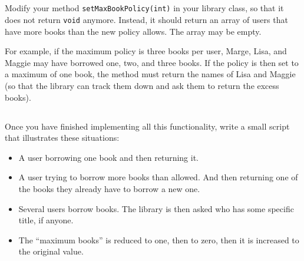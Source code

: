 \documentclass{article}
\begin{document}
\subsection{}

Modify your method \verb+setMaxBookPolicy(int)+ in your library class,
so that it does not return \verb+void+ anymore. Instead, it should
return an array of users that have more books than the new policy
allows. The array may be empty. 

For example, if the maximum policy is three books per user, Marge,
Lisa, and Maggie may have borrowed one, two, and three books. If the
policy is then set to a maximum of one book, the method must return
the names of Lisa and Maggie (so that the library can track them down
and ask them to return the excess books).

\subsection{}

Once you have finished implementing all this functionality, write a
small script that illustrates these situations: 

\begin{itemize}
\item A user borrowing one book and then returning it.
\item A user trying to borrow more books than allowed. And then
  returning one of the books they already have to borrow a new one.
\item Several users borrow books. The library is then asked who has
  some specific title, if anyone. 
\item The ``maximum books'' is reduced to one, then to zero, then it
  is increased to the original value.  
\end{itemize}
\end{document}
